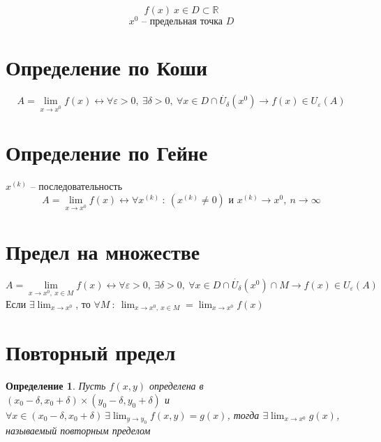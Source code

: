 \documentclass[a4paper, 12pt, titlepage, fleqn]{article}
\newtheorem{Def}{Определение}[section]
\newcommand{\Real}{\mathbb{R}}
\newcommand{\T}{\textbf}
\begin{document}
	\begin{titlepage}
	\end{titlepage}
	\[
		f(x) \: x \in D \subset \Real
	\]
	\[
		x^0 \T{ -- предельная точка } D
	\]
	\section{Определение по Коши}
		\[
			A = \lim_{x \to x^0} f(x) \leftrightarrow \forall \varepsilon > 0 ,\: \exists \delta > 0 ,\: \forall x \in D \cap \dot{U_\delta} (x^0) \to f(x) \in U_\varepsilon(A)
		\]
	\section{Определение по Гейне}
		$x^{(k)}$ -- последовательность
		\[
			A = \lim_{x \to x^0} f(x) \leftrightarrow \forall x^{(k)} \: \colon\: (x^{(k)} \ne 0) \T{ и } x^{(k)} \to x^0, \: n\to\infty
		\]
	\section{Предел на множестве}
	\[
		A = \lim_{x \to x^0, \: x \in M} f(x) \leftrightarrow \forall \varepsilon > 0, \: \exists \delta > 0, \: \forall x \in D \cap \dot{U_\delta} (x^0) \cap M \to f(x) \in U_\varepsilon(A)
	\]
	Если $\exists \lim_{x \to x^0}$, то $\forall M \:\colon\: \lim_{x \to x^0, \: x \in M} = \lim_{x \to x^0} f(x)$
	
	\section{Повторный предел}
		\begin{Def}
			Пусть $f(x, y)$ определена в $(x_0 - \delta, x_0 + \delta)\times(y_0 - \delta, y_0 + \delta)$ и $\forall x \in (x_0 - \delta, x_0 + \delta) \: \exists \lim_{y \to y_0} f(x, y) = g(x)$, тогда $\exists\lim_{x \to x^0} g(x)$, называемый повторным пределом
		\end{Def}
\end{document}
